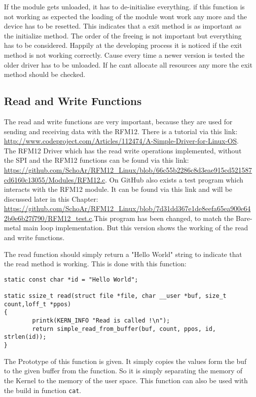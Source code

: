 If the module gets unloaded, it has to de-initialise everything. if this function is not working as expected the loading of the module wont work any more and the device has to be resetted. This indicates that a exit method is as important as the initialize method. The order of the freeing is not important but everything has to be considered. Happily at the developing process it is noticed if the exit method is not working correctly. Cause every time a newer version is tested the older driver has to be unloaded. If he cant allocate all resources any more the exit method should be checked.  

\subsection{Read and Write Functions}

The read and write functions are very important, because they are used for sending and receiving data with the RFM12. There is a tutorial via this link: \url{http://www.codeproject.com/Articles/112474/A-Simple-Driver-for-Linux-OS}. The RFM12 Driver which has the read write operations implemented, without the SPI and the RFM12 functions can be found via this link: \url{https://github.com/SchoAr/RFM12_Linux/blob/66c55b2286c8d3eae915cd521587cd6160c13055/Modules/RFM12.c}. On GitHub also exists a test program which interacts with the RFM12 module. It can be found via this link and will be discussed later in this Chapter: \url{https://github.com/SchoAr/RFM12_Linux/blob/7d31dd367e1de8eefa65ea900e642b0e6b27f790/RFM12_test.c}.\newline This program has been changed, to match the Bare-metal main loop implementation. But this version shows the working of the read and write functions. \newline

The read function should simply return a "Hello World" string to indicate that the read method is working. This is done with this function: 
\begin{lstlisting}   
static const char *id = "Hello World";
                                                                                                                    
static ssize_t read(struct file *file, char __user *buf, size_t count,loff_t *ppos)
{
		printk(KERN_INFO "Read is called !\n");
		return simple_read_from_buffer(buf, count, ppos, id, strlen(id));
}
\end{lstlisting}

The Prototype of this function is given. It simply copies the values form the buf to the given buffer from the function. So it is simply separating the memory of the Kernel to the memory of the user space. This function can also be used with the build in function \verb|cat|. \newline

